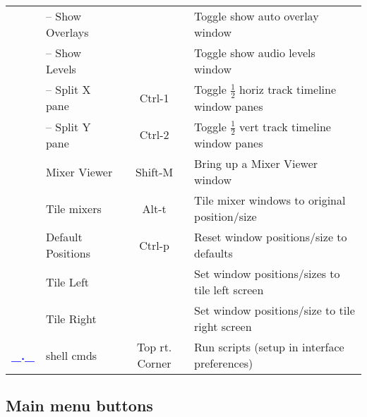 \begin{center}
\begin{longtable}{>{\bfseries}c l c p{6cm}}
             & -- Show Overlays &  & Toggle show auto overlay window \\             
             & -- Show Levels &  & Toggle show audio levels window \\             
             & -- Split X pane & Ctrl-1 & Toggle $\frac{1}{2}$ horiz track timeline window panes \\             
             & -- Split Y pane & Ctrl-2 & Toggle $\frac{1}{2}$ vert track timeline window panes \\             
             & Mixer Viewer & Shift-M & Bring up a Mixer Viewer window \\             
             & Tile mixers & Alt-t & Tile mixer windows to original position/size \\             
             & Default Positions & Ctrl-p & Reset window positions/size to defaults \\             
             & Tile Left &  & Set window positions/sizes to tile left screen \\             
             & Tile Right &  & Set window positions/size to tile right screen \\
             \midrule
           \textcolor{blue}{\_.\_} & shell cmds & Top rt. Corner & Run scripts (setup in interface preferences) \\
                     
             \bottomrule  
    \end{longtable}
\end{center}

\subsection{Main menu buttons}%
\label{sub:main_menu_buttons}

